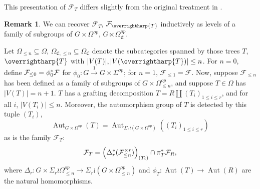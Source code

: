 \documentclass[a4paper,10pt
,draft
]{article}%
\numberwithin{equation}{section}
\numberwithin{figure}{section}
\theoremstyle{definition} %
\newtheorem{remark}[equation]{Remark}%
\newcommand{\vect}[1]{\text{\overrightharp{\ensuremath{#1}}}}
\DeclareMathOperator{\Aut}{Aut}%
\newcommand{\F}{\ensuremath{\mathcal F}}
\newcommand{\1}{\ensuremath{\mathbbm 1}}%
\begin{document}
This presentation of $\F_T$ differs slightly from the original treatment in \cite[Prop. 6.44]{BP_geo}.

\begin{remark}
      \label{FT_REM}
      We can recover $\F_T$, $\F_{\vect T}$ inductively as levels of a family of subgroups of $G \times \Omega^{op}$, $G \ltimes \Omega_{\mathfrak C}^{op}$.
      
      Let $\Omega_{\leq n} \subseteq \Omega$, $\Omega_{\mathfrak C, \leq n} \subseteq \Omega_{\mathfrak C}$ denote
      the subcategories spanned by those trees $T$, $\vect T$ with $|V(T)|,|V(\vect T)| \leq n$.
      For $n = 0$, define $\F_{\leq 0} = \phi_0^{\**}\F$ for $\phi_0 \colon G \xrightarrow{1} G \times \Sigma^{op}$;
      for $n = 1$, $\F_{\leq 1} = \F$.
      Now, suppose $\F_{\leq n}$ has been defined as a family of subgroups of $G \times \Omega_{\leq n}^{op}$,
      and suppose $T \in \Omega$ has $|V(T)| = n+1$.
      $T$ has a grafting decomposition $T = R \amalg (T_i)_{1 \leq i \leq r}$, and for all $i$, $|V(T_i)| \leq n$.
      Moreover, the automorphism group of $T$ is detected by this tuple $(T_i)$,
      \[
            \Aut_{G \times \Omega^{op}}(T) = \Aut_{\Sigma_r \wr (G \times \Omega^{op})}\left((T_i)_{1 \leq i \leq r}\right)
      \]
      as is the family $\F_T$:
      \begin{equation}
            \label{FT_IND_EQ}
            \F_T = \left(\Delta_r^{\**}(\F_{\leq n}^{\ltimes r})\right)_{(T_i)} \cap \pi_T^{\**} \F_R,
      \end{equation}
      where $\Delta_r \colon G \times \Sigma_r \wr \Omega_{\leq n}^{op} \to \Sigma_r \wr (G \times \Omega_{\leq n}^{op})$ and
      $\phi_T \colon \Aut(T) \to \Aut(R)$ are the natural homomorphisms.


\end{remark}
\end{document}
